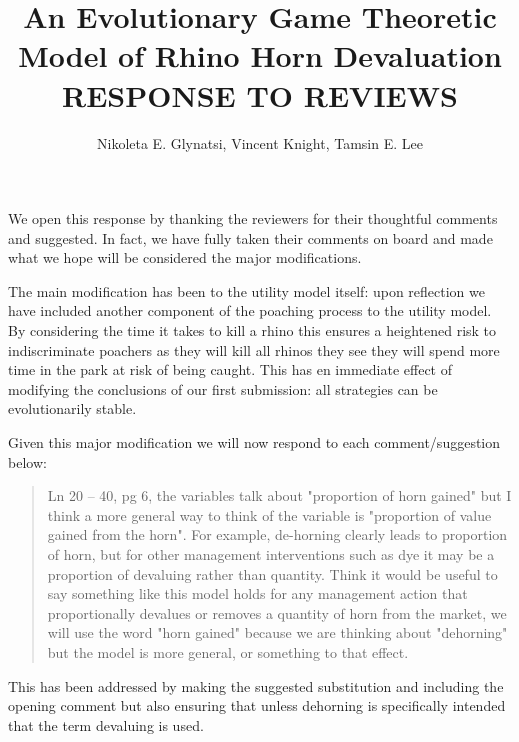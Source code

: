 \documentclass[10pt]{article}
\title{An Evolutionary Game Theoretic Model of Rhino Horn Devaluation RESPONSE
       TO REVIEWS}
\author{Nikoleta E. Glynatsi, Vincent Knight, Tamsin E. Lee} %
\begin{document}
We open this response by thanking the reviewers for their thoughtful comments
and suggested. In fact, we have fully taken their comments on board and
made what we hope will be considered the major modifications.

The main modification has been to the utility model itself: upon reflection we
have included another component of the poaching process to the utility model. By
considering the time it takes to kill a rhino this ensures a heightened risk to
indiscriminate poachers as they will kill all rhinos they see they will spend
more time in the park at risk of being caught. This has en immediate effect of
modifying the conclusions of our first submission: all strategies can
be evolutionarily stable.

Given this major modification we will now respond to each comment/suggestion
below:

\begin{quote}
    Ln 20 – 40, pg 6, the variables talk about "proportion of horn gained" but I think a more general way to think of the variable is "proportion of value gained from the horn". For example, de-horning clearly leads to proportion of horn, but for other management interventions such as dye it may be a proportion of devaluing rather than quantity. Think it would be useful to say something like this model holds for any management action that proportionally devalues or removes a quantity of horn from the market, we will use the word "horn gained" because we are thinking about "dehorning" but the model is more general, or something to that effect.
\end{quote}

This has been addressed by making the suggested substitution and including the
opening comment but also ensuring
that unless dehorning is specifically intended that the term devaluing is used.
\end{document}
